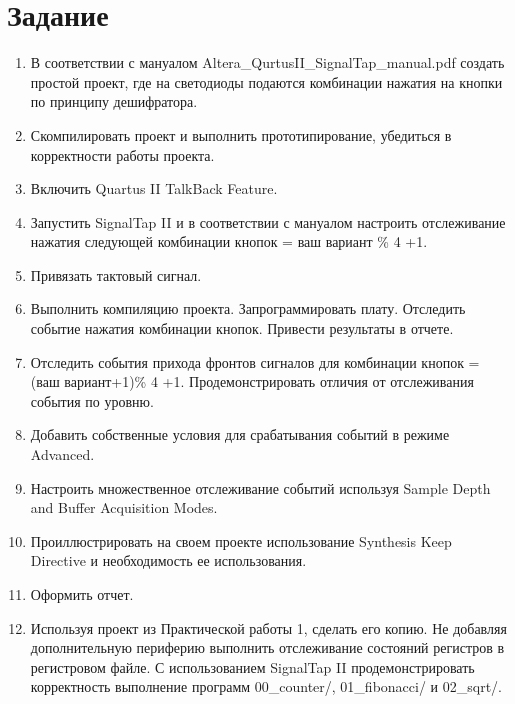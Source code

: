 \documentclass[a4paper,14pt]{article}
\begin{document}
	
	\tableofcontents
	\pagebreak
	\section{Задание}
	
	\begin{enumerate}
		\item В соответствии с мануалом Altera\_QurtusII\_SignalTap\_manual.pdf создать простой проект, где на светодиоды подаются комбинации нажатия на кнопки по принципу дешифратора.
		
		\item Скомпилировать проект и выполнить прототипирование, убедиться в корректности работы проекта.
		
		\item Включить Quartus II TalkBack Feature.
		
		\item Запустить SignalTap II и в соответствии с мануалом настроить отслеживание нажатия следующей комбинации кнопок = ваш вариант \% 4 +1.
		
		\item Привязать тактовый сигнал.
		
		\item Выполнить компиляцию проекта. Запрограммировать плату. Отследить событие нажатия комбинации кнопок. Привести результаты в отчете.
		
		\item Отследить события прихода фронтов сигналов для комбинации кнопок = (ваш вариант+1)\% 4 +1. Продемонстрировать отличия от отслеживания события по уровню.
		
		\item Добавить собственные условия для срабатывания событий в режиме Advanced.
			
		\item Настроить множественное отслеживание событий используя Sample Depth and Buffer Acquisition Modes.
		
		\item Проиллюстрировать на своем проекте использование Synthesis Keep Directive и необходимость ее использования.
		
		\item Оформить отчет.
		
		\item Используя проект из Практической работы 1, сделать его копию.
		Не добавляя дополнительную периферию выполнить отслеживание состояний регистров в регистровом файле.
		С использованием SignalTap II продемонстрировать корректность выполнение программ 00\_counter/, 01\_fibonacci/ и 02\_sqrt/.
		

\end{enumerate}
\end{document}
